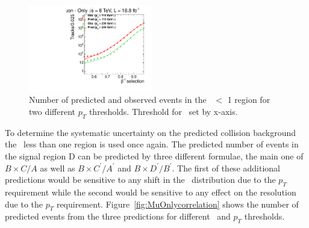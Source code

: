 \begin{figure}
\centering
  \includegraphics[clip=false, trim=0.0cm 0cm 0.0cm 0cm, width=0.48\textwidth]{figures/muonly/Prediction_Data8TeV_NPredVsNObs_Flip}
  \caption[Number of predicted and observed events in the \invbeta\ $<$ 1 region in the \muononly\ analysis]
{Number of predicted and observed events in the \invbeta\ $<$ 1 region for two different $p_T$ thresholds. Threshold for \invbeta\ set by x-axis.}
    \label{fig:PredFlipPt230}
\end{figure}

To determine the systematic uncertainty on the predicted collision background the \invbeta\ less than one region is used once again. The predicted number of events
in the signal region D can be predicted by three different formulae, the main one of $B \times C/A$ as well as 
$B \times C^{\prime}/A^{\prime}$ and $B \times D^{\prime}/B^{\prime}$.
The first of these additional predictions would be sensitive to any shift in the \invbeta\ distribution due to the $p_T$ requirement while the second would be
sensitive to any effect on the resolution due to the $p_T$ requirement. Figure~\ref{fig:MuOnlycorrelation} shows the number of predicted events from the three predictions
for different \invbeta\ and $p_T$ thresholds.

